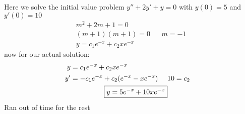 \documentclass{article}
\begin{document}
\subsubsection{}
Here we solve the initial value problem $y'' + 2y' + y = 0$ with $y(0) = 5$ and $y'(0) = 10$
\begin{align*}
    m^2 + 2m + 1 = 0 \\
    (m+1)(m+1) = 0 && m = -1\\
    y = c_1e^{-x} + c_2xe^{-x}
\end{align*}
now for our actual solution:
\begin{align*}
    y &= c_1e^{-x} + c_2xe^{-x} \\
    y'&= -c_1e^{-x} + c_2(e^{-x} - xe^{-x}) && 10 = c_2 \\
    & \Aboxed{y = 5e^{-x} + 10xe^{-x}}
\end{align*}
Ran out of time for the rest
\end{document}

